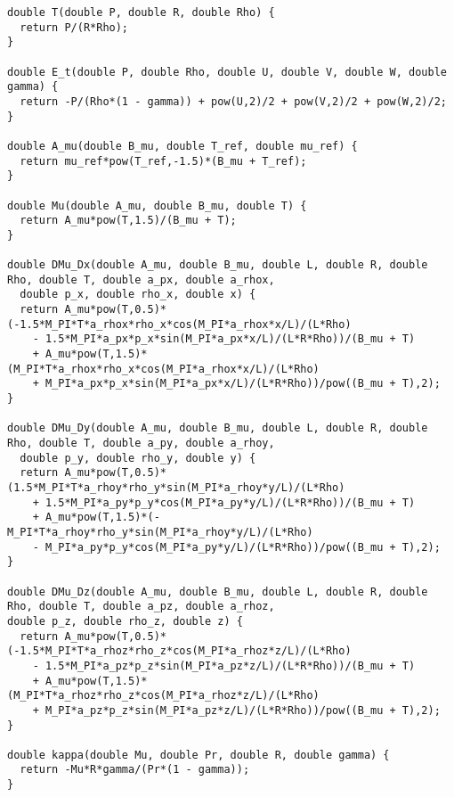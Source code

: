 \documentclass[10pt]{article}
\begin{document}
\begin{footnotesize}
\begin{verbatim}
double T(double P, double R, double Rho) {
  return P/(R*Rho);
}

double E_t(double P, double Rho, double U, double V, double W, double gamma) {
  return -P/(Rho*(1 - gamma)) + pow(U,2)/2 + pow(V,2)/2 + pow(W,2)/2;
}

double A_mu(double B_mu, double T_ref, double mu_ref) {
  return mu_ref*pow(T_ref,-1.5)*(B_mu + T_ref);
}

double Mu(double A_mu, double B_mu, double T) {
  return A_mu*pow(T,1.5)/(B_mu + T);
}

double DMu_Dx(double A_mu, double B_mu, double L, double R, double Rho, double T, double a_px, double a_rhox, 
  double p_x, double rho_x, double x) {
  return A_mu*pow(T,0.5)*(-1.5*M_PI*T*a_rhox*rho_x*cos(M_PI*a_rhox*x/L)/(L*Rho) 
	- 1.5*M_PI*a_px*p_x*sin(M_PI*a_px*x/L)/(L*R*Rho))/(B_mu + T) 
	+ A_mu*pow(T,1.5)*(M_PI*T*a_rhox*rho_x*cos(M_PI*a_rhox*x/L)/(L*Rho) 
	+ M_PI*a_px*p_x*sin(M_PI*a_px*x/L)/(L*R*Rho))/pow((B_mu + T),2);
}

double DMu_Dy(double A_mu, double B_mu, double L, double R, double Rho, double T, double a_py, double a_rhoy, 
  double p_y, double rho_y, double y) {
  return A_mu*pow(T,0.5)*(1.5*M_PI*T*a_rhoy*rho_y*sin(M_PI*a_rhoy*y/L)/(L*Rho) 
	+ 1.5*M_PI*a_py*p_y*cos(M_PI*a_py*y/L)/(L*R*Rho))/(B_mu + T) 
	+ A_mu*pow(T,1.5)*(-M_PI*T*a_rhoy*rho_y*sin(M_PI*a_rhoy*y/L)/(L*Rho) 
	- M_PI*a_py*p_y*cos(M_PI*a_py*y/L)/(L*R*Rho))/pow((B_mu + T),2);
}

double DMu_Dz(double A_mu, double B_mu, double L, double R, double Rho, double T, double a_pz, double a_rhoz, 
double p_z, double rho_z, double z) {
  return A_mu*pow(T,0.5)*(-1.5*M_PI*T*a_rhoz*rho_z*cos(M_PI*a_rhoz*z/L)/(L*Rho) 
	- 1.5*M_PI*a_pz*p_z*sin(M_PI*a_pz*z/L)/(L*R*Rho))/(B_mu + T) 
	+ A_mu*pow(T,1.5)*(M_PI*T*a_rhoz*rho_z*cos(M_PI*a_rhoz*z/L)/(L*Rho) 
	+ M_PI*a_pz*p_z*sin(M_PI*a_pz*z/L)/(L*R*Rho))/pow((B_mu + T),2);
}

double kappa(double Mu, double Pr, double R, double gamma) {
  return -Mu*R*gamma/(Pr*(1 - gamma));
}


\end{verbatim}
\end{footnotesize}
\end{document}
